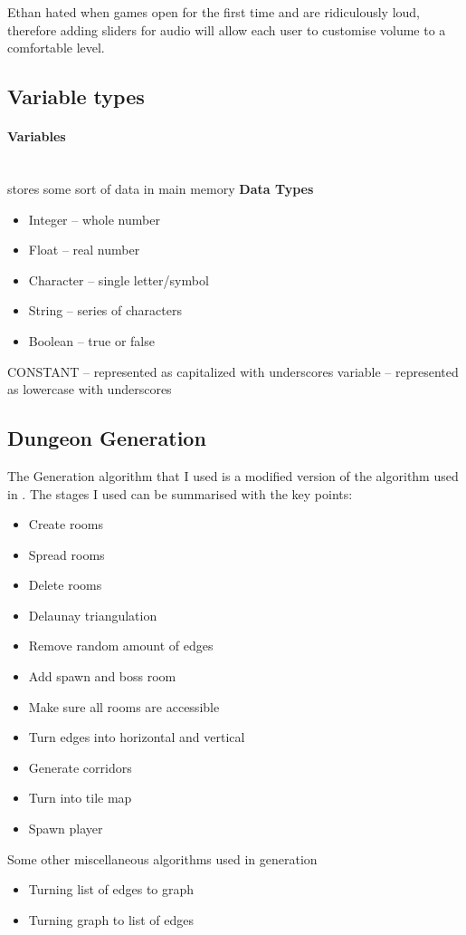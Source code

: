 \documentclass{article}
\newcommand{\parBr}{\vspace{5mm}}%
\newcommand{\myparagraph}[1]{\paragraph{#1}\mbox{}\\} %
\begin{document}
\parBr

Ethan hated when games open for the first time and are ridiculously loud, therefore adding sliders for audio will allow each user to customise volume to a comfortable level.

\subsection{Variable types}   

\myparagraph{Variables}
stores some sort of data in main memory \linebreak \textbf{Data Types}
\begin{itemize}
\item Integer – whole number   
\item Float – real number   
\item Character – single letter/symbol   
\item String – series of characters   
\item Boolean – true or false   
\end{itemize}

CONSTANT – represented as capitalized with underscores
\linebreak
variable – represented as lowercase with underscores 

\subsection{Dungeon Generation}
The Generation algorithm that I used is a modified version of the algorithm used in {\cite{Gen_Alg}}. The stages I used can be summarised with the key points:
\begin{itemize}
\item{Create rooms}
\item{Spread rooms}
\item{Delete rooms}
\item{Delaunay triangulation}
\item{Remove random amount of edges}
\item{Add spawn and boss room}
\item{Make sure all rooms are accessible}
\item{Turn edges into horizontal and vertical}
\item{Generate corridors}
\item{Turn into tile map}
\item{Spawn player}
\end{itemize}
Some other miscellaneous algorithms used in generation
\begin{itemize}
\item{Turning list of edges to graph}
\item{Turning graph to list of edges}
\end{itemize}
\end{document}
